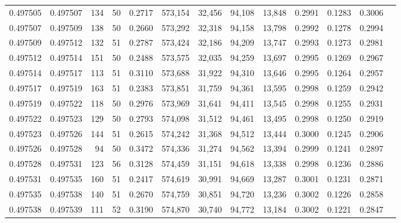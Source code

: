 \begin{tabular}{rrrrrrrrrrrrr}
0.497505 & 0.497507 &   134 &  50 &                                     0.2717 & 573,154 &  32,456 &  94,108 &  13,848 & 0.2991 & 0.1283 & 0.3006 \\
0.497507 & 0.497509 &   138 &  50 &                                     0.2660 & 573,292 &  32,318 &  94,158 &  13,798 & 0.2992 & 0.1278 & 0.2994 \\
0.497509 & 0.497512 &   132 &  51 &                                     0.2787 & 573,424 &  32,186 &  94,209 &  13,747 & 0.2993 & 0.1273 & 0.2981 \\
0.497512 & 0.497514 &   151 &  50 &                                     0.2488 & 573,575 &  32,035 &  94,259 &  13,697 & 0.2995 & 0.1269 & 0.2967 \\
0.497514 & 0.497517 &   113 &  51 &                                     0.3110 & 573,688 &  31,922 &  94,310 &  13,646 & 0.2995 & 0.1264 & 0.2957 \\
0.497517 & 0.497519 &   163 &  51 &                                     0.2383 & 573,851 &  31,759 &  94,361 &  13,595 & 0.2998 & 0.1259 & 0.2942 \\
0.497519 & 0.497522 &   118 &  50 &                                     0.2976 & 573,969 &  31,641 &  94,411 &  13,545 & 0.2998 & 0.1255 & 0.2931 \\
0.497522 & 0.497523 &   129 &  50 &                                     0.2793 & 574,098 &  31,512 &  94,461 &  13,495 & 0.2998 & 0.1250 & 0.2919 \\
0.497523 & 0.497526 &   144 &  51 &                                     0.2615 & 574,242 &  31,368 &  94,512 &  13,444 & 0.3000 & 0.1245 & 0.2906 \\
0.497526 & 0.497528 &    94 &  50 &                                     0.3472 & 574,336 &  31,274 &  94,562 &  13,394 & 0.2999 & 0.1241 & 0.2897 \\
0.497528 & 0.497531 &   123 &  56 &                                     0.3128 & 574,459 &  31,151 &  94,618 &  13,338 & 0.2998 & 0.1236 & 0.2886 \\
0.497531 & 0.497535 &   160 &  51 &                                     0.2417 & 574,619 &  30,991 &  94,669 &  13,287 & 0.3001 & 0.1231 & 0.2871 \\
0.497535 & 0.497538 &   140 &  51 &                                     0.2670 & 574,759 &  30,851 &  94,720 &  13,236 & 0.3002 & 0.1226 & 0.2858 \\
0.497538 & 0.497539 &   111 &  52 &                                     0.3190 & 574,870 &  30,740 &  94,772 &  13,184 & 0.3002 & 0.1221 & 0.2847 \\

\end{tabular}

